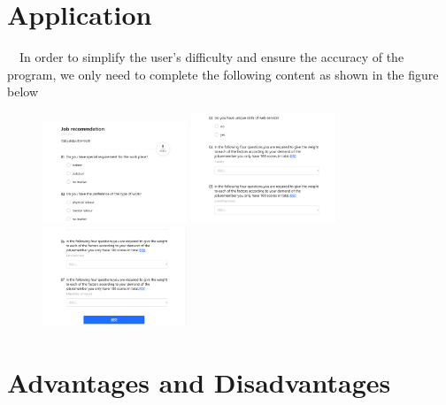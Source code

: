 \documentclass[12pt]{article}
\begin{document}
\section{Application}
~~In order to simplify the user's difficulty and ensure the accuracy of the program, we only need to complete the following content as shown in the figure below%
\begin{figure}[!htbp]
    \centering
    {
    \begin{minipage}[t]{0.3\linewidth}
    \centering
    \includegraphics[width=1.7in]{figure/t1.png}
    \end{minipage}%
    }%
    {
    \begin{minipage}[t]{0.3\linewidth}
    \centering
    \includegraphics[width=1.7in]{figure/t2.png}
    \end{minipage}%
    }%
    {
    \begin{minipage}[t]{0.3\linewidth}
    \centering
    \includegraphics[width=1.7in]{figure/t3.png}
    \end{minipage}
    }%
    \end{figure}
\section{Advantages and Disadvantages}
\end{document}
